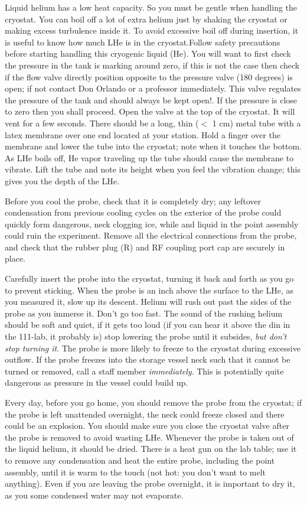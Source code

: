 \documentclass{../lab}
\begin{document}
Liquid helium has a low heat capacity. So you must be gentle when handling the cryostat. You can boil off a lot of extra helium just by shaking the cryostat or making excess turbulence inside it. To avoid excessive boil off during insertion, it is useful to know how much LHe is in the cryostat.Follow safety precautions before starting handling this cryogenic liquid (He). You will want to first check the pressure in the tank is marking around zero, if this is not the case then check if the flow valve directly position opposite to the pressure valve (180 degrees) is open; if not contact Don Orlando or a professor immediately. This valve regulates the pressure of the tank and should always be kept open!. If the pressure is close to zero then you shall proceed. Open the valve at the top of the cryostat. It will vent for a few seconds. There should be a long, thin ($<$ 1 cm) metal tube with a latex membrane over one end located at your station. Hold a finger over the membrane and lower the tube into the cryostat; note when it touches the bottom. As LHe boils off, He vapor traveling up the tube should cause the membrane to vibrate. Lift the tube and note its height when you feel the vibration change; this gives you the depth of the LHe.

Before you cool the probe, check that it is completely dry; any leftover condensation from previous cooling cycles on the exterior of the probe could quickly form dangerous, neck clogging ice, while and liquid in the point assembly could ruin the experiment. Remove all the electrical connections from the probe, and check that the rubber plug (R) and RF coupling port cap are securely in place.

Carefully insert the probe into the cryostat, turning it back and forth as you go to prevent sticking. When the probe is an inch above the surface to the LHe, as you measured it, slow up its descent. Helium will rush out past the sides of the probe as you immerse it. Don't go too fast. The sound of the rushing helium should be soft and quiet, if it gets too loud (if you can hear it above the din in the 111-lab, it probably is) stop lowering the probe until it subsides, \emph{but don't stop turning it}. The probe is more likely to freeze to the cryostat during excessive outflow. If the probe freezes into the storage vessel neck such that it cannot be turned or removed, call a staff member \emph{immediately}. This is potentially quite dangerous as pressure in the vessel could build up.

Every day, before you go home, you should remove the probe from the cryostat; if the probe is left unattended overnight, the neck could freeze closed and there could be an explosion. You should make sure you close the cryostat valve after the probe is removed to avoid wasting LHe. Whenever the probe is taken out of the liquid helium, it should be dried. There is a heat gun on the lab table; use it to remove any condensation and heat the entire probe, including the point assembly, until it is warm to the touch (not hot: you don't want to melt anything). Even if you are leaving the probe overnight, it is important to dry it, as you some condensed water may not evaporate.
\end{document}
